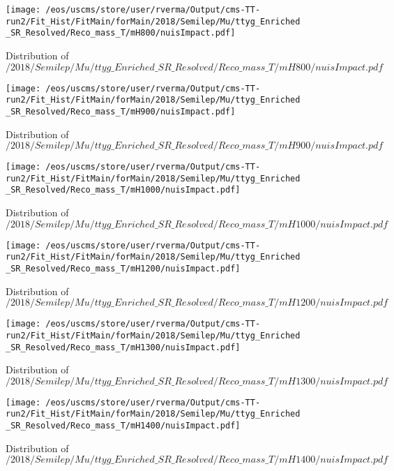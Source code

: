 \begin{figure}
\centering
\texttt{[image: /eos/uscms/store/user/rverma/Output/cms-TT-run2/Fit\_Hist/FitMain/forMain/2018/Semilep/Mu/ttyg\_Enriched\_SR\_Resolved/Reco\_mass\_T/mH800/nuisImpact.pdf]}
\caption{Distribution of $/2018/Semilep/Mu/ttyg\_Enriched\_SR\_Resolved/Reco\_mass\_T/mH800/nuisImpact.pdf$}
\end{figure}

\begin{figure}
\centering
\texttt{[image: /eos/uscms/store/user/rverma/Output/cms-TT-run2/Fit\_Hist/FitMain/forMain/2018/Semilep/Mu/ttyg\_Enriched\_SR\_Resolved/Reco\_mass\_T/mH900/nuisImpact.pdf]}
\caption{Distribution of $/2018/Semilep/Mu/ttyg\_Enriched\_SR\_Resolved/Reco\_mass\_T/mH900/nuisImpact.pdf$}
\end{figure}

\begin{figure}
\centering
\texttt{[image: /eos/uscms/store/user/rverma/Output/cms-TT-run2/Fit\_Hist/FitMain/forMain/2018/Semilep/Mu/ttyg\_Enriched\_SR\_Resolved/Reco\_mass\_T/mH1000/nuisImpact.pdf]}
\caption{Distribution of $/2018/Semilep/Mu/ttyg\_Enriched\_SR\_Resolved/Reco\_mass\_T/mH1000/nuisImpact.pdf$}
\end{figure}

\begin{figure}
\centering
\texttt{[image: /eos/uscms/store/user/rverma/Output/cms-TT-run2/Fit\_Hist/FitMain/forMain/2018/Semilep/Mu/ttyg\_Enriched\_SR\_Resolved/Reco\_mass\_T/mH1200/nuisImpact.pdf]}
\caption{Distribution of $/2018/Semilep/Mu/ttyg\_Enriched\_SR\_Resolved/Reco\_mass\_T/mH1200/nuisImpact.pdf$}
\end{figure}

\begin{figure}
\centering
\texttt{[image: /eos/uscms/store/user/rverma/Output/cms-TT-run2/Fit\_Hist/FitMain/forMain/2018/Semilep/Mu/ttyg\_Enriched\_SR\_Resolved/Reco\_mass\_T/mH1300/nuisImpact.pdf]}
\caption{Distribution of $/2018/Semilep/Mu/ttyg\_Enriched\_SR\_Resolved/Reco\_mass\_T/mH1300/nuisImpact.pdf$}
\end{figure}

\begin{figure}
\centering
\texttt{[image: /eos/uscms/store/user/rverma/Output/cms-TT-run2/Fit\_Hist/FitMain/forMain/2018/Semilep/Mu/ttyg\_Enriched\_SR\_Resolved/Reco\_mass\_T/mH1400/nuisImpact.pdf]}
\caption{Distribution of $/2018/Semilep/Mu/ttyg\_Enriched\_SR\_Resolved/Reco\_mass\_T/mH1400/nuisImpact.pdf$}
\end{figure}

